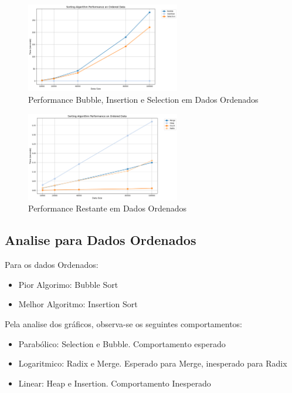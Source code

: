 \begin{figure}[H]
  \centering
  \includegraphics[width=0.6\textwidth]{images/o2_order}
  \caption{Performance Bubble, Insertion e Selection em Dados Ordenados}
  \label{fig:Performance Bubble, Insertion e Selection em Dados Ordenados}
\end{figure}

\begin{figure}[H]
  \centering
  \includegraphics[width=0.6\textwidth]{images/o_order}
  \caption{Performance Restante em Dados Ordenados }
  \label{fig:Gráfico Performance Dados Ordenados}
\end{figure}

\subsection{Analise para Dados Ordenados}
Para os dados Ordenados:
\begin{itemize}
  \item Pior Algorimo: Bubble Sort
  \item Melhor Algoritmo: Insertion Sort
\end{itemize}
Pela analise dos gráficos, observa-se os seguintes comportamentos:
\begin{itemize}
  \item Parabólico: Selection e Bubble. Comportamento esperado 
  \item Logaritmico: Radix e Merge. Esperado para Merge, inesperado para Radix 
  \item Linear: Heap e Insertion. Comportamento Inesperado
\end{itemize}
